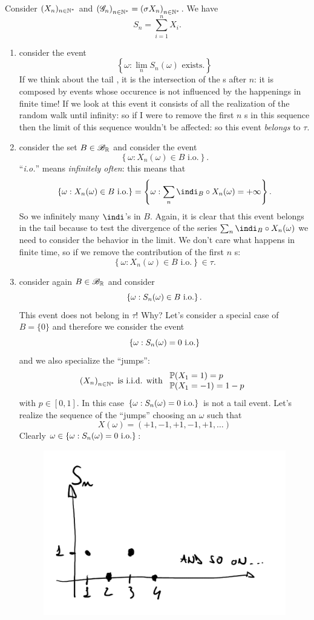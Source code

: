 \documentclass{report}
\begin{document}
\begin{example}
	Consider ${(X_n)_{n\in\mathbb{N}^{*}}}$ and ${(\mathscr{G}_n)}_{n\in\mathbb{N}^{*}}={(\sigma X_n)}_{n\in\mathbb{N}^{*}}$. We have 
	\[S_n=\sum_{i=1}^{n}X_i.\]
	\begin{enumerate}[\circnum]
		\item consider the event
		\[\left\{\omega:\lim_{n}S_n(\omega)\text{ exists.}\right\}\]
		If we think about the tail \sa, it is the intersection of the \sa s after $n$: it is composed by events whose occurence is not influenced by the happenings in finite time! If we look at this event it consists of all the realization of the random walk until infinity: so if I were to remove the first $n$ \rv s in this sequence then the limit of this sequence wouldn't be affected: so this event \textit{belongs} to $\tau$.
		\item consider the set $B\in\mathscr{B}_{\mathbb{R}}$ and consider the event
		\[\left\{\omega :X_n(\omega)\in B\text{ i.o.}\right\}.\]
		``\textit{i.o.}'' means \textit{infinitely often}: this means that
		\[\left\{\omega :X_n(\omega)\in B\text{ i.o.}\right\}=\left\{\omega:\sum_n\indi_B\circ X_n(\omega)=+\infty\right\}.\]
		So we infinitely many $\indi$'s in $B$. Again, it is clear that this event belongs in the tail \sa{} because to test the divergence of the series $\sum_n\indi_B\circ X_n(\omega)$ we need to consider the behavior in the limit. We don't care what happens in finite time, so if we remove the contribution of the first $n$ \rv s:
		\[\left\{\omega :X_n(\omega)\in B\text{ i.o.}\right\}\in\tau.\]
		\item consider again $B\in\mathscr{B}_{\mathbb{R}}$ and consider 
		\[\left\{\omega: S_n(\omega)\in B\text{ i.o.}\right\}.\]
		This event does not belong in $\tau$! Why? Let's consider a special case of $B=\{0\}$ and therefore we consider the event
		\[\left\{\omega:S_n(\omega)=0\text{ i.o.}\right\}\]
		and we also specialize the ``jumps'':
		\[{(X_n)}_{n\in\mathbb{N}^{*}}\text{ is i.i.d. with }\begin{array}{l}
			\mathbb{P}(X_1=1)=p\\
			\mathbb{P}(X_1=-1)=1-p
		\end{array}\]
		with $p\in[0,1]$. In this case $\left\{\omega:S_n(\omega)=0\text{ i.o.}\right\}$ is not a tail event. Let's realize the sequence of the ``jumps'' choosing an $\omega$ such that
		\[X(\omega)=(+1,-1,+1,-1,+1,\ldots)\]
		Clearly $\omega\in\left\{\omega:S_n(\omega)=0\text{ i.o.}\right\}$:
		\begin{figure}[H]
			\centering
			\includegraphics[width=0.5\linewidth]{screenshot006}

\end{figure}
\end{enumerate}
\end{example}
\end{document}
